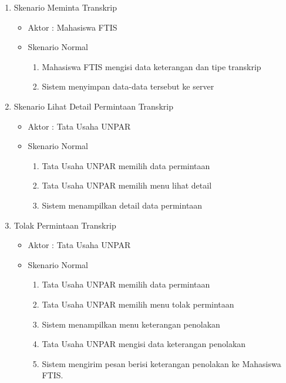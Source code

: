 \begin{enumerate}
	\item Skenario Meminta Transkrip
	\begin{itemize}
		\item Aktor : Mahasiswa FTIS
		\item Skenario Normal
			\begin{enumerate}[1.]
				\item Mahasiswa FTIS mengisi data keterangan dan tipe transkrip 
				\item Sistem menyimpan data-data tersebut ke server 
			\end{enumerate}
	\end{itemize}
	
	\item Skenario Lihat Detail Permintaan Transkrip
	\begin{itemize}
		\item Aktor : Tata Usaha UNPAR
		\item Skenario Normal
			\begin{enumerate}[1.]
				\item Tata Usaha UNPAR memilih data permintaan
				\item Tata Usaha UNPAR memilih menu lihat detail
				\item Sistem menampilkan detail data permintaan
			\end{enumerate}
	\end{itemize}
	
	\item Tolak Permintaan Transkrip
	\begin{itemize}
		\item Aktor : Tata Usaha UNPAR
		\item Skenario Normal
			\begin{enumerate}[1.]
				\item Tata Usaha UNPAR memilih data permintaan
				\item Tata Usaha UNPAR memilih menu tolak permintaan
				\item Sistem menampilkan menu keterangan penolakan
				\item Tata Usaha UNPAR mengisi data keterangan penolakan
				\item Sistem mengirim pesan berisi keterangan penolakan ke Mahasiswa FTIS.
			\end{enumerate}
	\end{itemize}
	

\end{enumerate}
